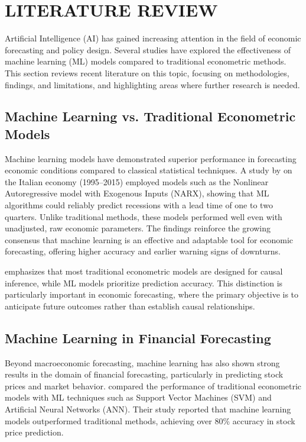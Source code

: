 \chapter{\uppercase{Literature Review}}
\label{chap:literature-review}

Artificial Intelligence (AI) has gained increasing attention in the field of economic forecasting and policy design.
Several studies have explored the effectiveness of machine learning (ML) models compared to traditional econometric methods.
This section reviews recent literature on this topic, focusing on methodologies, findings, and limitations, and highlighting areas where further research is needed.

\section{Machine Learning vs. Traditional Econometric Models}
\label{sec:ml-vs-traditional-econometric-models}

Machine learning models have demonstrated superior performance in forecasting economic conditions compared to
classical statistical techniques. A study by \citet{HarishParuchuri} on the Italian economy (1995–2015) employed models such as the
Nonlinear Autoregressive model with Exogenous Inputs (NARX), showing that ML algorithms could reliably predict
recessions with a lead time of one to two quarters. Unlike traditional methods, these models performed well even
with unadjusted, raw economic parameters. The findings reinforce the growing consensus that machine learning is an
effective and adaptable tool for economic forecasting, offering higher accuracy and earlier warning signs of downturns.

\citet{Varian2014-ez} emphasizes that most traditional econometric models are designed for causal inference, while ML models prioritize prediction accuracy.
This distinction is particularly important in economic forecasting, where the primary objective is to anticipate future outcomes rather than establish causal relationships.

\section{Machine Learning in Financial Forecasting}
\label{sec:ml-in-financial-forecasting}

Beyond macroeconomic forecasting, machine learning has also shown strong results in the domain of financial forecasting,
particularly in predicting stock prices and market behavior. \citet{Hsu2016-in} compared the performance of traditional econometric models
with ML techniques such as Support Vector Machines (SVM) and Artificial Neural Networks (ANN).
Their study reported that machine learning models outperformed traditional methods, achieving over 80\% accuracy in stock price prediction.

